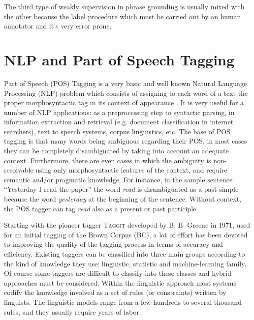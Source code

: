 The third type of weakly supervision in phrase grounding is usually
mixed with the other because the label procedure which must be carried
out by an human annotator and it's very error prone.

\section{NLP and Part of Speech Tagging}

Part of Speech (POS) Tagging is a very basic and well known Natural
Language Processing (NLP) problem which consists of assigning to each
word of a text the proper morphosyntactic tag in its context of
appearance \cite{marquez2000machine}. It is very useful for a number
of NLP applications: as a preprocessing step to syntactic parsing,
in information extraction and retrieval (e.g. document classification
in internet searchers), text to speech systems, corpus linguistics,
etc. The base of POS tagging is that many words being ambiguous
regarding their POS, in most cases they can be completely
disambiguated by taking into account an adequate context. Furthermore,
there are even cases in which the ambiguity is non-resolvable using
only morphosyntactic features of the context, and require semantic
and/or pragmatic knowledge. For instance, in the sample sentence
``Yesterday I read the paper'' the word \textit{read} is disambiguated
as a past simple because the word \textit{yesterday} at the beginning
of the sentence. Without context, the POS tagger can tag \textit{read}
also as a present or past participle.

Starting with the pioneer tagger \textsc{Taggit} developed by B. B.
Greene \etal{} in 1971, used for an initial tagging of the Brown
Corpus (BC), a lot of effort has been devoted to improving the quality
of the tagging process in terms of accuracy and efficiency. Existing
taggers can be classified into three main groups according to the kind
of knowledge they use: linguistic, statistic and machine-learning
family. Of course some taggers are difficult to classify into these
classes and hybrid approaches must be considered. Within the
linguistic approach most systems codify the knowledge involved as a
set of rules (or constraints) written by linguists. The linguistic
models range from a few hundreds to several thousand rules, and they
usually require years of labor.


